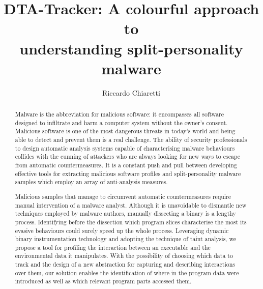 \documentclass[LaM,binding=0.6cm]{sapthesis}
\title{DTA-Tracker: A colourful approach to\\understanding split-personality malware}
\author{Riccardo Chiaretti}
\begin{document}
\frontmatter
\maketitle

\dedication{Dedicated to to my parents and my brother, \\without their support I would never have achieved this goal.}

\begin{abstract}
Malware is the abbreviation for malicious software: it encompasses all software designed to infiltrate and harm a computer system without the owner's consent. Malicious software is one of the most dangerous threats in today's world and being able to detect and prevent them is a real challenge. The ability of security professionals to design automatic analysis systems capable of characterising malware behaviours collides with the cunning of attackers who are always looking for new ways to escape from automatic countermeasures. It is a constant push and pull between developing effective tools for extracting malicious software profiles and split-personality malware samples which employ an array of anti-analysis measures.

Malicious samples that manage to circumvent automatic countermeasures require manual intervention of a malware analyst. Although it is unavoidable to dismantle new techniques employed by malware authors, manually dissecting a binary is a lengthy process. Identifying before the dissection which program slices characterise the most its evasive behaviours could surely speed up the whole process. Leveraging dynamic binary instrumentation technology and adopting the technique of taint analysis, we propose a tool for profiling the interaction between an executable and the environmental data it manipulates. With the possibility of choosing which data to track and the design of a new abstraction for capturing and describing interactions over them, our solution enables the identification of where in the program data were introduced as well as which relevant program parts accessed them. 
\end{abstract}
\end{document}
